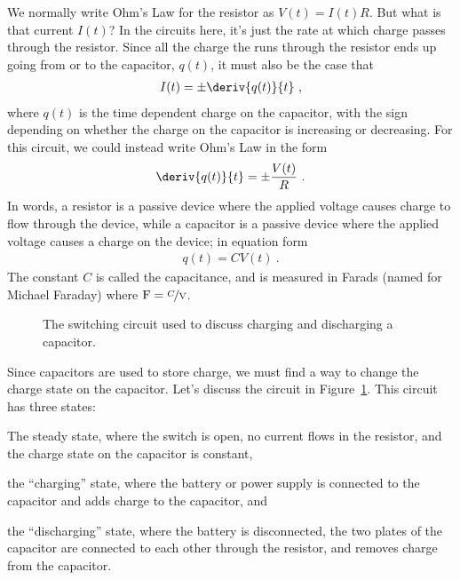 \documentclass[12pt]{article}
\begin{document}
We normally write Ohm's Law for the resistor as $V(t) = I(t) R$.  But
what is that current $I(t)$?  In the circuits here, it's just the rate
at which charge passes through the resistor.  Since all the charge the
runs through the resistor ends up going from or to the capacitor,
$q(t)$, it must also be the case that
\begin{gather*}
  I(t) = \pm \deriv{q(t)}{t}\ ,
\end{gather*}
where $q(t)$ is the time dependent charge on the capacitor, with the
sign depending on whether the charge on the capacitor is increasing or
decreasing.  For this circuit, we could instead write Ohm's Law in the
form
\begin{gather*}
  \deriv{q(t)}{t} = \pm \frac{V(t)}{R}\ .
\end{gather*}
In words, a resistor is a passive device where the applied voltage
causes charge to flow through the device, while a capacitor is a
passive device where the applied voltage causes a charge on the
device; in equation form
\begin{gather*}
  q(t) = C V(t)\ .
\end{gather*}
The constant $C$ is called the capacitance, and is measured in Farads
(named for Michael Faraday) where $\unit{F} = \unit{\nicefrac{C}{V}}$.

\begin{figure}
  \centering
  
  \caption{The switching circuit used to discuss charging and
    discharging a capacitor.} 
  \label{fig:circuit}
\end{figure}
Since capacitors are used to store charge, we must find a way to
change the charge state on the capacitor.  Let's discuss the circuit
in Figure~\ref{fig:circuit}.  This circuit has three states:
\begin{inparaenum}
\item The steady state, where the switch is open, no current flows in
  the resistor, and the charge state on the capacitor is constant,
\item the ``charging'' state, where the battery or power supply is
  connected to the capacitor and adds charge to the capacitor, and
\item the ``discharging'' state, where the battery is disconnected,
  the two plates of the capacitor are connected to each other
  through the resistor, and removes charge from the capacitor.
\end{inparaenum}
\end{document}

